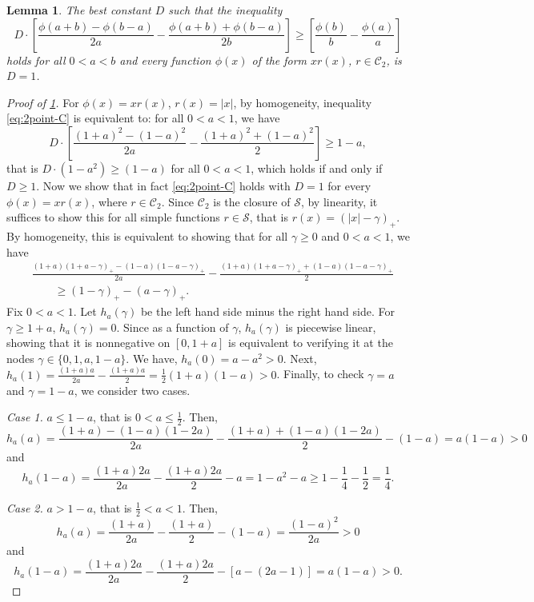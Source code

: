\documentclass[10pt]{article}
\newcommand{\1}{\textbf{1}}
\newtheorem{lemma}{Lemma}[subsection]
\theoremstyle{remark}
\theoremstyle{definition}
\begin{document}
\begin{lemma}\label{lm:2point-C}
The best constant $D$ such that the inequality
\begin{equation}\label{eq:2point-C}
D\cdot\left[\frac{\phi(a+b)-\phi(b-a)}{2a} - \frac{\phi(a+b)+\phi(b-a)}{2b}\right] \geq \left[ \frac{\phi(b)}{b}-\frac{\phi(a)}{a}\right]
\end{equation}
holds for all $0 < a < b$ and every function $\phi(x)$ of the form $xr(x)$, $r \in \mathcal{C}_2$, is $D=1$.
\end{lemma}
\begin{proof}[Proof of \ref{lm:2point-C}]
For $\phi(x) = xr(x)$, $r(x) = |x|$, by homogeneity, inequality \eqref{eq:2point-C} is equivalent to: for all $0 < a < 1$, we have
\[
D\cdot\left[\frac{(1+a)^2-(1-a)^2}{2a} - \frac{(1+a)^2+(1-a)^2}{2}\right] \geq 1-a,
\]
that is $D\cdot(1-a^2) \geq (1-a)$ for all $0 < a < 1$, which holds if and only if $D \geq 1$. Now we show that in fact \eqref{eq:2point-C} holds with $D=1$ for every $\phi(x) = xr(x)$, where $r \in \mathcal{C}_2$. Since $\mathcal{C}_2$ is the closure of $\mathcal{S}$, by linearity, it suffices to show this for all simple functions $r \in \mathcal{S}$, that is $r(x) = (|x|-\gamma)_+$. By homogeneity, this is equivalent to showing that for all $\gamma \geq 0$ and $0 < a < 1$, we have
\begin{align*}
&\frac{(1+a)(1+a-\gamma)_+-(1-a)(1-a-\gamma)_+}{2a} - \frac{(1+a)(1+a-\gamma)_++(1-a)(1-a-\gamma)_+}{2} \\
&\qquad\geq  (1-\gamma)_+-(a-\gamma)_+.
\end{align*}
Fix $0 < a < 1$. Let $h_a(\gamma)$ be the left hand side minus the right hand side. For $\gamma \geq 1+a$, $h_a(\gamma) = 0$. Since as a function of $\gamma$, $h_a(\gamma)$ is piecewise linear, showing that it is nonnegative on $[0,1+a]$ is equivalent to verifying it at the nodes $\gamma \in \{0, 1, a, 1-a\}$. We have, $h_a(0) = a-a^2 > 0$. Next, $h_a(1) = \frac{(1+a)a}{2a} - \frac{(1+a)a}{2} = \frac{1}{2}(1+a)(1-a) > 0$. Finally, to check $\gamma = a$ and $\gamma = 1-a$, we consider two cases.

\bigskip
\noindent
\emph{Case 1.} $a \leq 1-a$, that is $0< a \leq \frac{1}{2}$. Then,
\[
h_a(a) = \frac{(1+a)-(1-a)(1-2a)}{2a} - \frac{(1+a)+(1-a)(1-2a)}{2} - (1-a) = a(1-a) > 0
\]
and
\[
h_a(1-a) = \frac{(1+a)2a}{2a} - \frac{(1+a)2a}{2}-a = 1-a^2-a \geq 1 - \frac{1}{4} - \frac{1}{2} = \frac{1}{4}.
\]


\bigskip
\noindent
\emph{Case 2.} $a > 1-a$, that is $\frac{1}{2} < a <1$. Then,
\[
h_a(a) = \frac{(1+a)}{2a} - \frac{(1+a)}{2} - (1-a) = \frac{(1-a)^2}{2a} > 0
\]
and
\[
h_a(1-a) = \frac{(1+a)2a}{2a} - \frac{(1+a)2a}{2}-[a-(2a-1)] = a(1-a) > 0.
\]
\end{proof}
\end{document}

